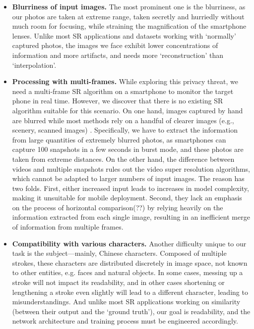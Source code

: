 \begin{itemize}[leftmargin=*]
  \item \textbf{Blurriness of input images.} The most prominent one is the blurriness, as our photos are taken at extreme range, taken secretly and hurriedly without much room for focusing, while straining the magnification of the smartphone lenses. Unlike most SR applications and datasets working with ‘normally’ captured photos, the images we face exhibit lower concentrations of information and more artifacts, and needs more ‘reconstruction’ than ‘interpolation’.
  \item \textbf{Processing with multi-frames.} While exploring this privacy threat, we need a multi-frame SR algorithm on a smartphone to monitor the target phone in real time. However, we discover that there is no existing SR algorithm suitable for this scenario. On one hand, images captured by hand are blurred while most methods rely on a handful of clearer images (e.g., scenery, scanned images) \cite{nasrollahi2020deep,lyn2020image}. Specifically, we have to extract the information from large quantities of extremely blurred photos, as smartphones can capture 100 snapshots in a few seconds in burst mode, and these photos are taken from extreme distances. On the other hand, the difference between videos and multiple snapshots rules out the video super resolution algorithms, which cannot be adapted to larger numbers of input images. The reason has two folds. First, either increased input leads to increases in model complexity, making it unsuitable for mobile deployment. Second, they lack an emphasis on the process of horizontal comparison(??) by relying heavily on the information extracted from each single image, resulting in an inefficient merge of information from multiple frames.
  \item \textbf{Compatibility with various characters.} Another difficulty unique to our task is the subject—mainly, Chinese characters. Composed of multiple strokes, these characters are distributed discretely in image space, not known to other entities, e.g. faces and natural objects. In some cases, messing up a stroke will not impact its readability, and in other cases shortening or lengthening a stroke even slightly will lead to a different character, leading to misunderstandings. And unlike most SR applications working on similarity (between their output and the ‘ground truth’), our goal is readability, and the network architecture and training process must be engineered accordingly.
\end{itemize}
 
